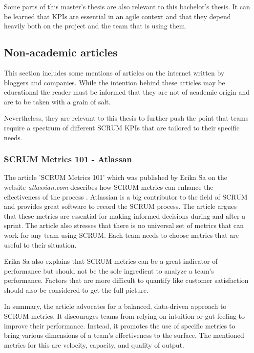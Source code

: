 Some parts of this master's thesis are also relevant to this bachelor's thesis.
It can be learned that KPIs are essential in an agile context and that they depend 
heavily both on the project and the team that is using them.

\subsection{Non-academic articles}

This section includes some mentions of articles on the internet written by bloggers and companies.
While the intention behind these articles may be educational the reader must be informed that they are not of academic origin and are to be taken with a grain of salt.

Nevertheless, they are relevant to this thesis to further push the point that teams require a spectrum of different 
SCRUM KPIs that are tailored to their specific needs.

\subsubsection*{SCRUM Metrics 101 - Atlassan}

The article 'SCRUM Metrics 101' which was published by Erika Sa on the website 
\textit{atlassian.com} describes how SCRUM metrics can enhance the 
effectiveness of the process \parencite{Atlassian2023}. 
Atlassian is a big contributor to the field of SCRUM and provides great software to record the SCRUM process.
The article argues that these metrics are essential for making informed 
decisions during and after a sprint. 
The article also stresses that there is no universal set of 
metrics that can work for any team using SCRUM. 
Each team needs to choose metrics that are useful to their situation. 

Erika Sa also explains that SCRUM metrics can be a great indicator of performance but should not be the sole ingredient to analyze a team's performance. 
Factors that are more difficult to quantify like customer satisfaction should also be considered to
get the full picture.

In summary, the article advocates for a balanced,
data-driven approach to SCRUM metrics. 
It discourages teams from relying on intuition or gut 
feeling to improve their performance. 
Instead, it promotes the use of specific metrics to 
bring various dimensions of a team's 
effectiveness to the surface. The mentioned metrics for 
this are velocity, capacity, and quality of output.

